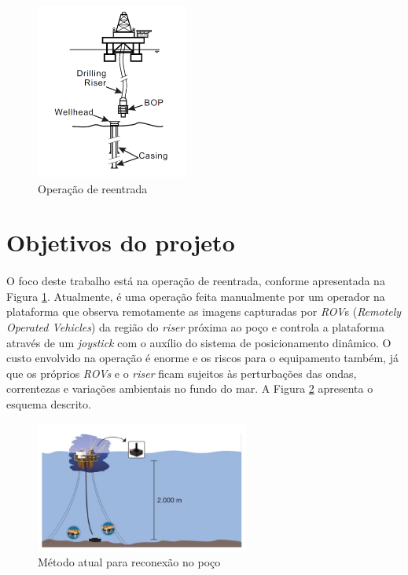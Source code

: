 \begin{figure}[ht!]
\centering
  \includegraphics[width=5cm]{figs/introducao/riser}
  \caption{Operação de reentrada \cite{eugenioASME2012}\label{riser}}
\end{figure}


\section{Objetivos do projeto}

\paragraph{} O foco deste trabalho está na operação de reentrada, conforme apresentada na Figura \ref{riser}. Atualmente, é uma operação feita manualmente por um operador na plataforma que observa remotamente as imagens capturadas por \textit{ROV}s (\textit{Remotely Operated Vehicles}) da região do \textit{riser} próxima ao poço e controla a plataforma através de um \textit{joystick} com o auxílio do sistema de posicionamento dinâmico. O custo envolvido na operação é enorme e os riscos para o equipamento também, já que os próprios \textit{ROVs} e o \textit{riser} ficam sujeitos às perturbações das ondas, correntezas e variações ambientais no fundo do mar. A Figura \ref{posicionamentoAtual} apresenta o esquema descrito.

\begin{figure}[ht!]
\centering
  \includegraphics[width=7cm]{figs/introducao/posicionamentoAtual}
  \caption{Método atual para reconexão no poço \cite{redytton} \label{posicionamentoAtual}}
\end{figure}

